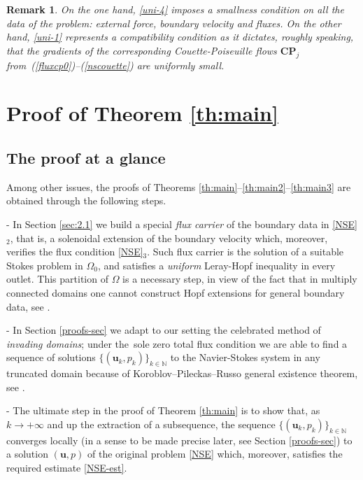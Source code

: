 \documentclass[11pt]{article}
\newtheorem{remark}[theorem]{Remark}
\numberwithin{equation}{section}
\numberwithin{figure}{section}
\def\ue{{\mathbf u}}
\begin{document}
\begin{remark}
{\rm On the one hand, \eqref{uni-4} imposes a smallness condition on all the data of the problem: external force, boundary velocity and fluxes. On the other hand, \eqref{uni-1} represents a compatibility condition as it dictates, 
roughly speaking, that {\it the gradients} of the corresponding  
Couette-Poiseuille flows $\mathbf{CP}_j$ from~(\ref{fluxcp0})--(\ref{nscouette}) are 
 uniformly small.}
\end{remark}

\section{Proof of Theorem \ref{th:main}}

\subsection{The proof at a glance} \label{glance}
Among other issues, the proofs of Theorems \ref{th:main}--\ref{th:main2}--\ref{th:main3} are obtained through the following steps.\par
- In Section \ref{sec:2.1} we build a special \textit{flux carrier} of the boundary data in \eqref{NSE}$_2$, that is, a solenoidal extension of the boundary
velocity which, moreover, verifies the flux condition \eqref{NSE}$_3$. Such flux carrier is the solution of a suitable Stokes problem in $\Omega_{0}$, and satisfies a \textit{uniform} Leray-Hopf inequality in every outlet. This partition of $\Omega$ is a necessary step, in view of the fact that in multiply connected domains one cannot construct
Hopf extensions for general boundary data, see \cite{heywood2011impossibility,takeshita1993remark}. \par
- In Section \ref{proofs-sec} we adapt to our setting the celebrated method of \textit{invading domains};   under the~sole zero total flux condition we are able to find a sequence of solutions
$\{(\ue_k,p_k) \}_{k \in \mathbb{N}}$ to the Navier-Stokes system in any truncated domain because of Koroblov--Pileckas--Russo general existence theorem, see \cite{korobkov2015solution,korobkov2024steady}. \par
- The ultimate step in the proof of Theorem \ref{th:main} is to show that, as $k\to+\infty$ and up the extraction of a subsequence,
the sequence $\{(\ue_k,p_k) \}_{k \in \mathbb{N}}$ converges locally (in a sense to be made precise later, see Section \ref{proofs-sec}) to a solution $(\ue,p)$ of the
original problem \eqref{NSE} which, moreover, satisfies the required estimate \eqref{NSE-est}. \par
\end{document}
